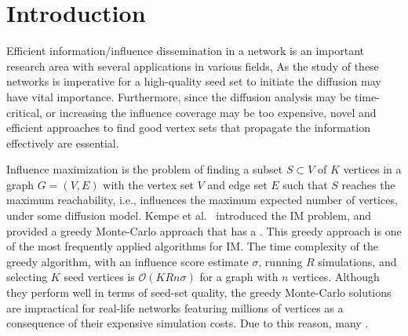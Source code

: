 \section{Introduction}

Efficient information/influence dissemination in a network is an important research area with several applications in various fields, 
As the study of these networks is imperative for  a high-quality seed set to initiate the diffusion may have vital importance.
Furthermore, since the diffusion analysis may be time-critical, or increasing the influence coverage may be too expensive, novel and efficient approaches to find good vertex sets that propagate the information effectively are essential.

Influence maximization is the problem of finding a subset $S \subset V$ of $K$ vertices in a graph $G = (V, E)$ with the vertex set $V$ and edge set $E$ such that $S$ reaches the maximum reachability, i.e., influences the maximum expected number of vertices, under some diffusion model. Kempe et al.~\cite{kempe2003maximizing} introduced the IM problem,  and provided a greedy Monte-Carlo approach that has a . This greedy approach is one of the most frequently applied algorithms for IM. The time complexity of the greedy algorithm, with an influence score estimate $\sigma$, running $R$ simulations, and selecting $K$ seed vertices is $\mathcal{O}(KRn\sigma)$ for a graph with $n$ vertices. Although they perform well in terms of seed-set quality, the greedy Monte-Carlo solutions are impractical for real-life networks featuring millions of vertices as a consequence of their expensive simulation costs. Due to this reason, many .

 


